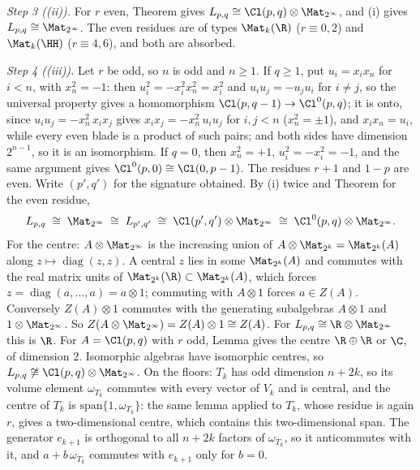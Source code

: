 \emph{Step 3 ((ii)).} For $r$ even, Theorem  gives $L_{p,q} \cong \Cl(p,q) \otimes \Mat_{2^{\infty}}$, and (i) gives $L_{p,q} \cong \Mat_{2^{\infty}}$. The even residues are of types $\Mat_{k}(\R)$ ($r \equiv 0, 2$) and $\Mat_{k}(\HH)$ ($r \equiv 4, 6$), and both are absorbed.

\emph{Step 4 ((iii)).} Let $r$ be odd, so $n$ is odd and $n \ge 1$. If $q \ge 1$, put $u_{i} = x_{i}x_{n}$ for $i < n$, with $x_{n}^{2} = -1$: then $u_{i}^{2} = -x_{i}^{2}x_{n}^{2} = x_{i}^{2}$ and $u_{i}u_{j} = -u_{j}u_{i}$ for $i \ne j$, so the universal property gives a homomorphism $\Cl(p, q-1) \to \Cl^{0}(p,q)$; it is onto, since $u_{i}u_{j} = -x_{n}^{2}\,x_{i}x_{j}$ gives $x_{i}x_{j} = -x_{n}^{2}\,u_{i}u_{j}$ for $i, j < n$ ($x_{n}^{2} = \pm 1$), and $x_{i}x_{n} = u_{i}$, while every even blade is a product of such pairs; and both sides have dimension $2^{n-1}$, so it is an isomorphism. If $q = 0$, then $x_{n}^{2} = +1$, $u_{i}^{2} = -x_{i}^{2} = -1$, and the same argument gives $\Cl^{0}(p,0) \cong \Cl(0, p-1)$. The residues $r + 1$ and $1 - p$ are even. Write $(p', q')$ for the signature obtained. By (i) twice and Theorem  for the even residue,
\[
L_{p,q} \;\cong\; \Mat_{2^{\infty}} \;\cong\; L_{p',q'} \;\cong\; \Cl(p', q') \otimes \Mat_{2^{\infty}} \;\cong\; \Cl^{0}(p,q) \otimes \Mat_{2^{\infty}}.
\]
For the centre: $A \otimes \Mat_{2^{\infty}}$ is the increasing union of $A \otimes \Mat_{2^{k}} = \Mat_{2^{k}}(A)$ along $z \mapsto \operatorname{diag}(z, z)$. A central $z$ lies in some $\Mat_{2^{k}}(A)$ and commutes with the real matrix units of $\Mat_{2^{k}}(\R) \subset \Mat_{2^{k}}(A)$, which forces $z = \operatorname{diag}(a, \dots, a) = a \otimes 1$; commuting with $A \otimes 1$ forces $a \in Z(A)$. Conversely $Z(A) \otimes 1$ commutes with the generating subalgebras $A \otimes 1$ and $1 \otimes \Mat_{2^{\infty}}$. So $Z(A \otimes \Mat_{2^{\infty}}) = Z(A) \otimes 1 \cong Z(A)$. For $L_{p,q} \cong \R \otimes \Mat_{2^{\infty}}$ this is $\R$. For $A = \Cl(p,q)$ with $r$ odd, Lemma  gives the centre $\R \oplus \R$ or $\C$, of dimension $2$. Isomorphic algebras have isomorphic centres, so $L_{p,q} \not\cong \Cl(p,q) \otimes \Mat_{2^{\infty}}$. On the floors: $T_{k}$ has odd dimension $n + 2k$, so its volume element $\omega_{T_{k}}$ commutes with every vector of $V_{k}$ and is central, and the centre of $T_{k}$ is $\mathrm{span}\{1, \omega_{T_{k}}\}$: the same lemma applied to $T_{k}$, whose residue is again $r$, gives a two-dimensional centre, which contains this two-dimensional span. The generator $e_{k+1}$ is orthogonal to all $n + 2k$ factors of $\omega_{T_{k}}$, so it anticommutes with it, and $a + b\,\omega_{T_{k}}$ commutes with $e_{k+1}$ only for $b = 0$.

